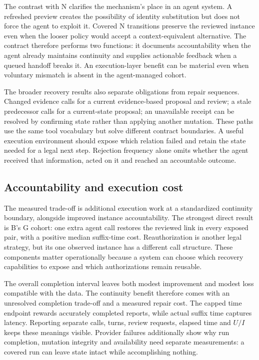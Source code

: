 \documentclass[10pt,a4paper,twocolumn]{article}
\begin{document}
The contrast with N clarifies the mechanism's place in an agent system. A refreshed preview creates the possibility of identity substitution but does not force the agent to exploit it. Covered N transitions preserve the reviewed instance even when the looser policy would accept a context-equivalent alternative. The contract therefore performs two functions: it documents accountability when the agent already maintains continuity and supplies actionable feedback when a queued handoff breaks it. An execution-layer benefit can be material even when voluntary mismatch is absent in the agent-managed cohort.

The broader recovery results also separate obligations from repair sequences. Changed evidence calls for a current evidence-based proposal and review; a stale predecessor calls for a current-state proposal; an unavailable receipt can be resolved by confirming state rather than applying another mutation. These paths use the same tool vocabulary but solve different contract boundaries. A useful execution environment should expose which relation failed and retain the state needed for a legal next step. Rejection frequency alone omits whether the agent received that information, acted on it and reached an accountable outcome.

\subsection{Accountability and execution cost}
The measured trade-off is additional execution work at a standardized continuity boundary, alongside improved instance accountability. The strongest direct result is B's G cohort: one extra agent call restores the reviewed link in every exposed pair, with a positive median suffix-time cost. Reauthorization is another legal strategy, but its one observed instance has a different call structure. These components matter operationally because a system can choose which recovery capabilities to expose and which authorizations remain reusable.

The overall completion interval leaves both modest improvement and modest loss compatible with the data. The continuity benefit therefore comes with an unresolved completion trade-off and a measured repair cost. The capped time endpoint rewards accurately completed reports, while actual suffix time captures latency. Reporting separate calls, turns, review requests, elapsed time and $U/I$ keeps these meanings visible. Provider failures additionally show why run completion, mutation integrity and availability need separate measurements: a covered run can leave state intact while accomplishing nothing.
\end{document}
